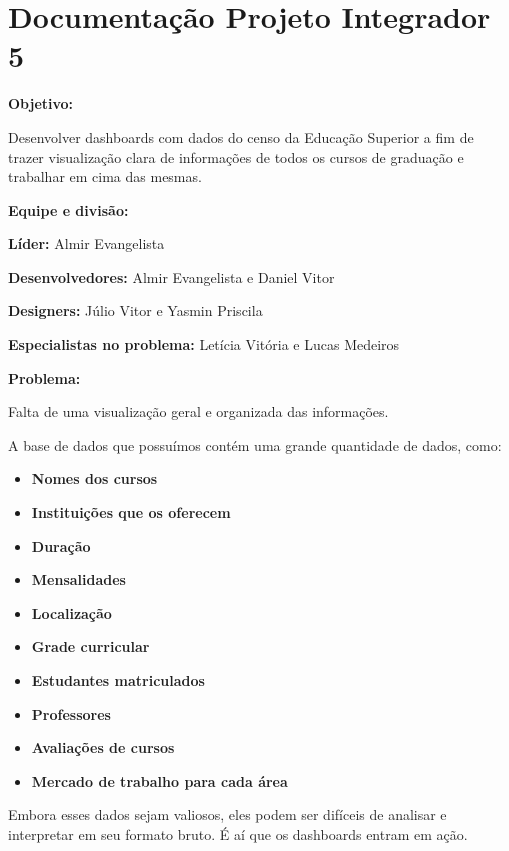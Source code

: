\documentclass[a4paper]{article}
\author{Almir Evangelista}
\date{2024-04-08}
\newcommand\textstyleListLabeli[1]{\textrm{#1}}
\begin{document}
\clearpage
\pagestyle{Standard}
\section{Documentação Projeto Integrador 5}

\bigskip

\textbf{Objetivo: }

Desenvolver dashboards com dados do censo da Educação Superior a fim de trazer visualização clara de informações de
todos os cursos de graduação e trabalhar em cima das mesmas.


\bigskip

\textbf{Equipe e divisão: }

\textbf{Líder: }Almir Evangelista

\textbf{Desenvolvedores: }Almir Evangelista e Daniel Vitor

\textbf{Designers: }Júlio Vitor e Yasmin Priscila

\textbf{Especialistas no problema:} Letícia Vitória e Lucas Medeiros


\bigskip

\textbf{Problema: }

Falta de uma visualização geral e organizada das informações.

\textcolor[HTML]{1F1F1F}{A base de dados que possuímos contém uma grande quantidade de dados, como:}

\begin{itemize}[series=listWWNumi,label=\textstyleListLabeli{[F0B7?]}]
\item \textbf{\textcolor[HTML]{1F1F1F}{Nomes dos cursos}}
\item \textbf{\textcolor[HTML]{1F1F1F}{Instituições que os oferecem}}
\item \textbf{\textcolor[HTML]{1F1F1F}{Duração}}
\item \textbf{\textcolor[HTML]{1F1F1F}{Mensalidades}}
\item \textbf{\textcolor[HTML]{1F1F1F}{Localização}}
\item \textbf{\textcolor[HTML]{1F1F1F}{Grade curricular}}
\item \textbf{\textcolor[HTML]{1F1F1F}{Estudantes matriculados}}
\item \textbf{\textcolor[HTML]{1F1F1F}{Professores}}
\item \textbf{\textcolor[HTML]{1F1F1F}{Avaliações de cursos}}
\item \textbf{\textcolor[HTML]{1F1F1F}{Mercado de trabalho para cada área}}
\end{itemize}
\textcolor[HTML]{1F1F1F}{Embora esses dados sejam valiosos, eles podem ser difíceis de analisar e interpretar em seu
formato bruto. É aí que os dashboards entram em ação.}
\end{document}
